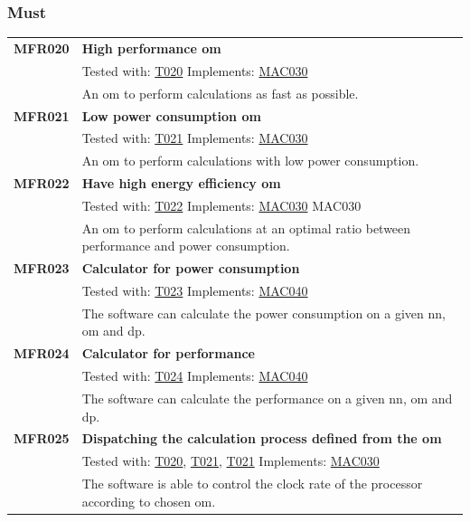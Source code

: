 \documentclass[parskip=full]{scrartcl}
\begin{document}
\subsubsection{Must}
\begin{tabular}{p{2cm}p{11.4cm}}
\textbf{MFR020} \hypertarget{MFR020} & \textbf{High \gls{performance} \gls{om}}\\         
& Tested with: \hyperlink{T020}{T020} Implements: \hyperlink{MAC030}{MAC030} \\                           
& An \gls{om} to perform calculations as fast as possible.\\
\textbf{MFR021} \hypertarget{MFR021}& \textbf{Low \gls{power consumption} \gls{om}}\\ 
& Tested with: \hyperlink{T021}{T021} Implements: \hyperlink{MAC030}{MAC030} \\                                   
& An \gls{om} to perform calculations with low \gls{power consumption}.\\
\textbf{MFR022} \hypertarget{MFR022}& \textbf{Have high energy efficiency \gls{om}}\\      
& Tested with: \hyperlink{T022}{T022}  Implements: \hyperlink{MAC030}{MAC030} MAC030 \\                              
& An \gls{om} to perform calculations at an optimal ratio between \gls{performance} and \gls{power consumption}.\\
\textbf{MFR023}\hypertarget{MFR023} & \textbf{Calculator for \gls{power consumption}}\\ & Tested with: \hyperlink{T023}{T023} Implements:  \hyperlink{MAC040}{MAC040} \\                                   
& The software can calculate the \gls{power consumption} on a given \gls{nn}, \gls{om} and \gls{dp}.\\
\textbf{MFR024}\hypertarget{MFR024} & \textbf{Calculator for \gls{performance}}\\
& Tested with: \hyperlink{T024}{T024} Implements: \hyperlink{MAC040}{MAC040} \\                                    
& The software can calculate the \gls{performance} on a given \gls{nn}, \gls{om} and \gls{dp}.\\
\textbf {MFR025} \hypertarget{MFR025}& \textbf{Dispatching the calculation process defined from the \gls{om}}\\
& Tested with: \hyperlink{T020}{T020}, \hyperlink{T021}{T021}, \hyperlink{T021}{T021} Implements: \hyperlink{MAC030}{MAC030}\\
& The software is able to control the clock rate of the processor according to chosen \gls{om}. \\
\end{tabular}
\end{document}
